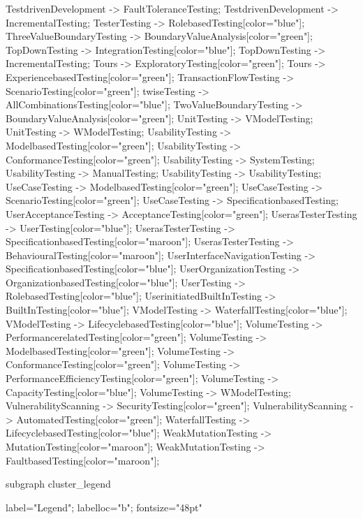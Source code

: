 \documentclass{article}
\begin{document}
{TestdrivenDevelopment -> FaultToleranceTesting;
TestdrivenDevelopment -> IncrementalTesting;
TesterTesting -> RolebasedTesting[color="blue"];
ThreeValueBoundaryTesting -> BoundaryValueAnalysis[color="green"];
TopDownTesting -> IntegrationTesting[color="blue"];
TopDownTesting -> IncrementalTesting;
Tours -> ExploratoryTesting[color="green"];
Tours -> ExperiencebasedTesting[color="green"];
TransactionFlowTesting -> ScenarioTesting[color="green"];
twiseTesting -> AllCombinationsTesting[color="blue"];
TwoValueBoundaryTesting -> BoundaryValueAnalysis[color="green"];
UnitTesting -> VModelTesting;
UnitTesting -> WModelTesting;
UsabilityTesting -> ModelbasedTesting[color="green"];
UsabilityTesting -> ConformanceTesting[color="green"];
UsabilityTesting -> SystemTesting;
UsabilityTesting -> ManualTesting;
UsabilityTesting -> UsabilityTesting;
UseCaseTesting -> ModelbasedTesting[color="green"];
UseCaseTesting -> ScenarioTesting[color="green"];
UseCaseTesting -> SpecificationbasedTesting;
UserAcceptanceTesting -> AcceptanceTesting[color="green"];
UserasTesterTesting -> UserTesting[color="blue"];
UserasTesterTesting -> SpecificationbasedTesting[color="maroon"];
UserasTesterTesting -> BehaviouralTesting[color="maroon"];
UserInterfaceNavigationTesting -> SpecificationbasedTesting[color="blue"];
UserOrganizationTesting -> OrganizationbasedTesting[color="blue"];
UserTesting -> RolebasedTesting[color="blue"];
UserinitiatedBuiltInTesting -> BuiltInTesting[color="blue"];
VModelTesting -> WaterfallTesting[color="blue"];
VModelTesting -> LifecyclebasedTesting[color="blue"];
VolumeTesting -> PerformancerelatedTesting[color="green"];
VolumeTesting -> ModelbasedTesting[color="green"];
VolumeTesting -> ConformanceTesting[color="green"];
VolumeTesting -> PerformanceEfficiencyTesting[color="green"];
VolumeTesting -> CapacityTesting[color="blue"];
VolumeTesting -> WModelTesting;
VulnerabilityScanning -> SecurityTesting[color="green"];
VulnerabilityScanning -> AutomatedTesting[color="green"];
WaterfallTesting -> LifecyclebasedTesting[color="blue"];
WeakMutationTesting -> MutationTesting[color="maroon"];
WeakMutationTesting -> FaultbasedTesting[color="maroon"];

subgraph cluster_legend {

    label="Legend";
    labelloc="b";
    fontsize="48pt"

}}
\end{document}
